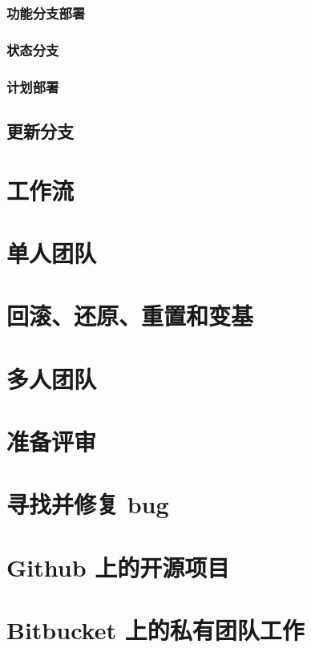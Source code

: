 \documentclass[cn,pad,11pt,green,geye]{../elegantnote}
\begin{document}
\subsubsection{功能分支部署}

\subsubsection{状态分支}

\subsubsection{计划部署}

\subsection{更新分支}

\section{工作流}

\section{单人团队}

\section{回滚、还原、重置和变基}

\section{多人团队}

\section{准备评审}

\section{寻找并修复 bug}

\section{Github 上的开源项目}

\section{Bitbucket 上的私有团队工作}
\end{document}
